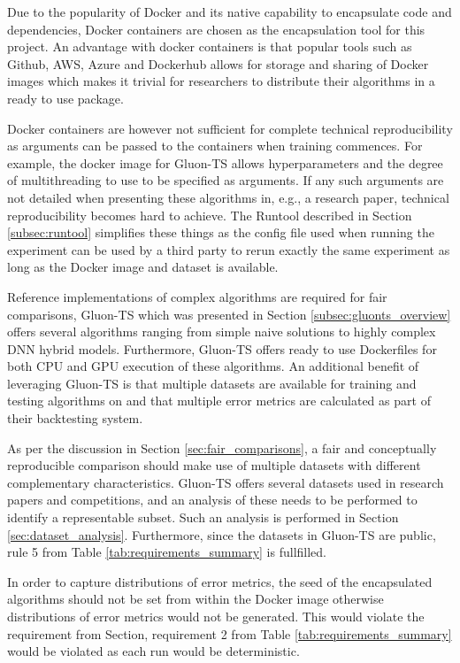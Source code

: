 Due to the popularity of Docker and its native capability to encapsulate code and dependencies, Docker containers are chosen as the encapsulation tool for this project. An advantage with docker containers is that popular tools such as Github, AWS, Azure and Dockerhub allows for storage and sharing of Docker images which makes it trivial for researchers to distribute their algorithms in a ready to use package.

Docker containers are however not sufficient for complete technical reproducibility as arguments can be passed to the containers when training commences. For example, the docker image for Gluon-TS allows hyperparameters and the degree of multithreading to use to be specified as arguments. If any such arguments are not detailed when presenting these algorithms in, e.g., a research paper, technical reproducibility becomes hard to achieve. The Runtool described in Section \ref{subsec:runtool} simplifies these things as the config file used when running the experiment can be used by a third party to rerun exactly the same experiment as long as the Docker image and dataset is available.

Reference implementations of complex algorithms are required for fair comparisons, Gluon-TS which was presented in Section \ref{subsec:gluonts_overview} offers several algorithms ranging from simple naive solutions to highly complex DNN hybrid models. Furthermore, Gluon-TS offers ready to use Dockerfiles for both CPU and GPU execution of these algorithms. An additional benefit of leveraging Gluon-TS is that multiple datasets are available for training and testing algorithms on and that multiple error metrics are calculated as part of their backtesting system.

As per the discussion in Section \ref{sec:fair_comparisons}, a fair and conceptually reproducible comparison should make use of multiple datasets with different complementary characteristics. Gluon-TS offers several datasets used in research papers and competitions, and an analysis of these needs to be performed to identify a representable subset. Such an analysis is performed in Section \ref{sec:dataset_analysis}. Furthermore, since the datasets in Gluon-TS are public, rule 5 from Table \ref{tab:requirements_summary} is fullfilled.

In order to capture distributions of error metrics, the seed of the encapsulated algorithms should not be set from within the Docker image otherwise distributions of error metrics would not be generated. This would violate the requirement from Section, requirement 2 from Table \ref{tab:requirements_summary} would be violated as each run would be deterministic.

